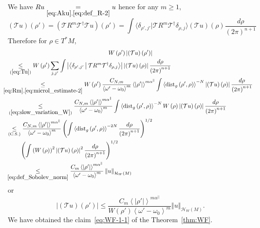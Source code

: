 \documentclass[AHL,Unicode,longabstracts,published]{cedram}
\newcommand*\ineq[1]{\underset{(#1)}{\leq}}
\newcommand{\clT}{\mathcal{T}}
\newcommand{\clH}{\mathcal{H}}
\newcommand{\dist}{\mathrm{dist}}
\newcommand{\clH}{\mathcal{H}}
\begin{document}
We have $Ru\underset{\eqref{eq:Aku},\eqref{eq:def_R-2}}{=}u$ hence for any $m\geq1$,
\begin{equation}\label{eq:Tu}
\left(\clT u\right)\left(\rho'\right)=\left(\clT R^{m}\clT^{\dagger}\clT u\right)\left(\rho'\right)=\int\langle\delta_{\rho',j'}|\clT R^{m}\clT^{\dagger}\delta_{\rho,j}\rangle\left(\clT u\right)\left(\rho\right)\frac{d\rho}{\left(2\pi\right)^{n+1}}
\end{equation}
Therefore for $\rho\in T^{*}M$,
\begin{multline*}
W\left(\rho'\right)\left|\left(\clT u\right)\left(\rho'\right)\right|\\
\begin{aligned}
& \ineq{\ref{eq:Tu}}W\left(\rho'\right)\sum_{j,j'}\int\left|\left\langle\delta_{\rho',j'}\,\middle|\,\clT R^{m}\clT^{\dagger}\delta_{\rho,j}\right\rangle\right|\left|\left(\clT u\right)\left(\rho\right)\right|\frac{d\rho}{\left(2\pi\right)^{n+1}}\\
& \mkern-20mu\underset{\eqref{eq:Rm},\eqref{eq:microl_estimate-2}}{\leq}W\left(\rho'\right)\frac{C_{N,m}}{\left\langle \omega'-\omega_{0}\right\rangle ^{m}}\left\langle \left|\rho'\right|\right\rangle ^{m\alpha^{\parallel}}\int\left\langle \dist_{g}\left(\rho',\rho\right)\right\rangle ^{-N}\left|\left(\clT u\right)\left(\rho\right)\right|\frac{d\rho}{\left(2\pi\right)^{n+1}}\\
& \mkern-3mu\ineq{\ref{eq:slow_variation_W}}\frac{C_{N,m}\left\langle \left|\rho'\right|\right\rangle ^{m\alpha^{\parallel}}}{\left\langle \omega'-\omega_{0}\right\rangle ^{m}}\int\left\langle \dist_{g}\left(\rho',\rho\right)\right\rangle ^{-N}W\left(\rho\right)\left|\left(\clT u\right)\left(\rho\right)\right|\frac{d\rho}{\left(2\pi\right)^{n+1}}\\
& \mkern-5mu\ineq{\mathrm{C.S.}}\frac{C_{N,m}\left\langle \left|\rho'\right|\right\rangle ^{m\alpha^{\parallel}}}{\left\langle \omega'-\omega_{0}\right\rangle ^{m}}\left(\int\left\langle \dist_{g}\left(\rho',\rho\right)\right\rangle ^{-2N}\frac{d\rho}{\left(2\pi\right)^{n+1}}\right)^{1/2}\\
& \qquad\left(\int\left(W\left(\rho\right)\right)^{2}\left|\left(\clT u\right)\left(\rho\right)\right|^{2}\frac{d\rho}{\left(2\pi\right)^{n+1}}\right)^{1/2}\\
& \mkern-07mu\underset{\eqref{eq:def_Sobolev_norm}}{\leq}\frac{C_{m}\left\langle \left|\rho'\right|\right\rangle ^{m\alpha^{\parallel}}}{\left\langle \omega'-\omega_{0}\right\rangle ^{m}}\left\Vert u\right\Vert _{\clH _{W}\left(M\right)}
\end{aligned}
\end{multline*}
or
\begin{equation}\label{eq:res-1-1}
\left|\left(\clT u\right)\left(\rho'\right)\right|\leq\frac{C_{m}\left\langle \left|\rho'\right|\right\rangle ^{m\alpha^{\parallel}}}{W\left(\rho'\right)\left\langle \omega'-\omega_{0}\right\rangle ^{m}}\left\Vert u\right\Vert _{\clH _{W}\left(M\right)}.
\end{equation}
We have obtained the claim~\eqref{eq:WF-1-1} of the Theorem~\ref{thm:WF}.
\end{document}
